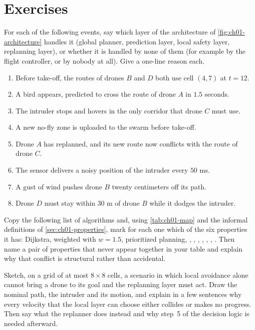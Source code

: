 \section{Exercises}
\label{sec:ch01-exercises}

\begin{exercise}[\difficulty{1}]
\label{exr:ch01-classify}
For each of the following events, say which layer of the architecture of
\cref{fig:ch01-architecture} handles it (global planner, prediction layer, local
safety layer, replanning layer), or whether it is handled by none of them (for example
by the flight controller, or by nobody at all). Give a one-line reason each.
\begin{enumerate}[label=(\alph*)]
  \item Before take-off, the routes of drones $B$ and $D$ both use cell $(4,7)$ at
        $t=12$.
  \item A bird appears, predicted to cross the route of drone $A$ in $1.5$ seconds.
  \item The intruder stops and hovers in the only corridor that drone $C$ must use.
  \item A new no-fly zone is uploaded to the swarm before take-off.
  \item Drone $A$ has replanned, and its new route now conflicts with the route of
        drone $C$.
  \item The sensor delivers a noisy position of the intruder every $50$ ms.
  \item A gust of wind pushes drone $B$ twenty centimeters off its path.
  \item Drone $D$ must stay within $30$ m of drone $B$ while it dodges the intruder.
\end{enumerate}
\end{exercise}

\begin{exercise}[\difficulty{1}]
\label{exr:ch01-properties}
Copy the following list of algorithms and, using \cref{tab:ch01-map} and the informal
definitions of \cref{sec:ch01-properties}, mark for each one which of the six
properties it has: Dijkstra, weighted \astar with $w=1.5$, prioritized planning,
\cbs, \ecbs, \arastar, \dstarlite, \orca, \rrt, \rrtstar. Then name a pair of
properties that never appear together in your table and explain why that conflict is
structural rather than accidental.
\end{exercise}

\begin{exercise}[\difficulty{2}]
\label{exr:ch01-local-insufficient}
Sketch, on a grid of at most $8\times 8$ cells, a scenario in which local avoidance
alone cannot bring a drone to its goal and the replanning layer must act. Draw the
nominal path, the intruder and its motion, and explain in a few sentences why every
velocity that the local layer can choose either collides or makes no progress. Then
say what the replanner does instead and why step~5 of the decision logic is needed
afterward.
\end{exercise}

